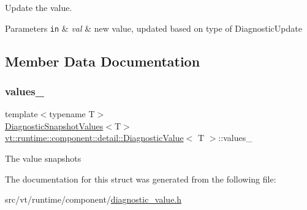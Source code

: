 Update the value. 


\begin{DoxyParams}[1]{Parameters}
\mbox{\tt in}  & {\em val} & new value, updated based on type of {\ttfamily Diagnostic\+Update} \\
\hline
\end{DoxyParams}


\subsection{Member Data Documentation}
\mbox{\label{structvt_1_1runtime_1_1component_1_1detail_1_1_diagnostic_value_a5f2fd96bc51a48245763ebb2d0c224c7}} 
\subsubsection{\texorpdfstring{values\+\_\+}{values\_}}
{\footnotesize\ttfamily template$<$typename T$>$ \\
\hyperlink{structvt_1_1runtime_1_1component_1_1detail_1_1_diagnostic_snapshot_values}{Diagnostic\+Snapshot\+Values}$<$T$>$ \hyperlink{structvt_1_1runtime_1_1component_1_1detail_1_1_diagnostic_value}{vt\+::runtime\+::component\+::detail\+::\+Diagnostic\+Value}$<$ T $>$\+::values\+\_\+\hspace{0.3cm}{\ttfamily [private]}}

The value snapshots 

The documentation for this struct was generated from the following file\+:\begin{DoxyCompactItemize}
\item 
src/vt/runtime/component/\hyperlink{diagnostic__value_8h}{diagnostic\+\_\+value.\+h}\end{DoxyCompactItemize}
